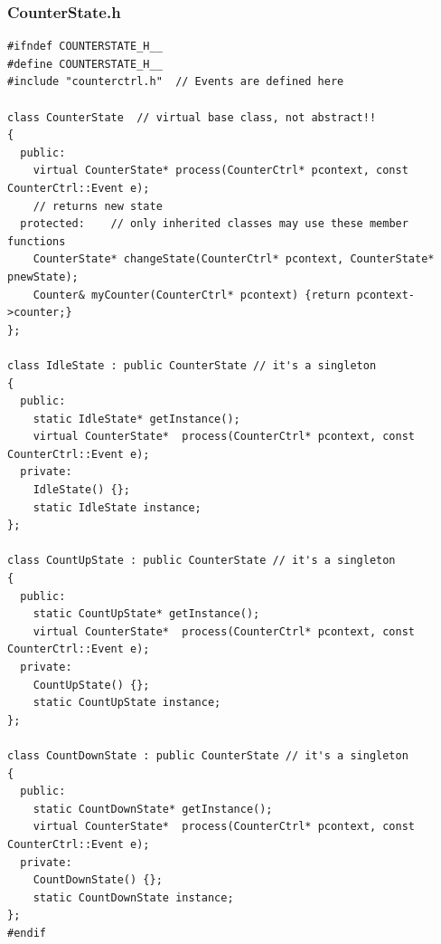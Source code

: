 \subsubsection{CounterState.h}
\begin{lstlisting}[style=Csharp]
#ifndef COUNTERSTATE_H__
#define COUNTERSTATE_H__
#include "counterctrl.h"  // Events are defined here

class CounterState  // virtual base class, not abstract!!
{
  public:
    virtual CounterState* process(CounterCtrl* pcontext, const CounterCtrl::Event e);
    // returns new state
  protected:    // only inherited classes may use these member functions
    CounterState* changeState(CounterCtrl* pcontext, CounterState* pnewState);
    Counter& myCounter(CounterCtrl* pcontext) {return pcontext->counter;}
};

class IdleState : public CounterState // it's a singleton
{
  public:
    static IdleState* getInstance();
    virtual CounterState*  process(CounterCtrl* pcontext, const CounterCtrl::Event e);
  private:
    IdleState() {};
    static IdleState instance;
};

class CountUpState : public CounterState // it's a singleton
{
  public:
    static CountUpState* getInstance();
    virtual CounterState*  process(CounterCtrl* pcontext, const CounterCtrl::Event e);
  private:
    CountUpState() {};
    static CountUpState instance;
};

class CountDownState : public CounterState // it's a singleton
{
  public:
    static CountDownState* getInstance();
    virtual CounterState*  process(CounterCtrl* pcontext, const CounterCtrl::Event e);
  private:
    CountDownState() {};
    static CountDownState instance;
};
#endif
\end{lstlisting}

